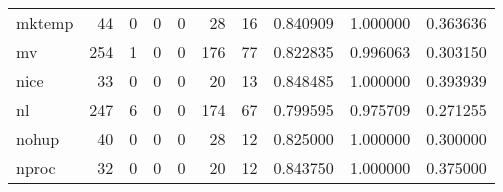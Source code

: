 \begin{tabular}{lrrrrrrrrr}
mktemp    &                                        44 &                                                  0 &                                                  0 &                                                  0 &                                                 28 &                                                 16 &                                           0.840909 &                               1.000000 &                             0.363636 \\
mv        &                                       254 &                                                  1 &                                                  0 &                                                  0 &                                                176 &                                                 77 &                                           0.822835 &                               0.996063 &                             0.303150 \\
nice      &                                        33 &                                                  0 &                                                  0 &                                                  0 &                                                 20 &                                                 13 &                                           0.848485 &                               1.000000 &                             0.393939 \\
nl        &                                       247 &                                                  6 &                                                  0 &                                                  0 &                                                174 &                                                 67 &                                           0.799595 &                               0.975709 &                             0.271255 \\
nohup     &                                        40 &                                                  0 &                                                  0 &                                                  0 &                                                 28 &                                                 12 &                                           0.825000 &                               1.000000 &                             0.300000 \\
nproc     &                                        32 &                                                  0 &                                                  0 &                                                  0 &                                                 20 &                                                 12 &                                           0.843750 &                               1.000000 &                             0.375000 \\

\end{tabular}

